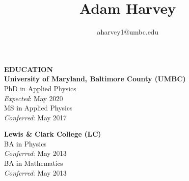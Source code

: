\documentclass{article}
\begin{document}
\singlespacing



\title{Adam Harvey}
\author{aharvey1@umbc.edu}


\maketitle
\noindent\textbf{EDUCATION}\\
\textbf{University of Maryland, Baltimore County (UMBC)}\\
PhD in Applied Physics\\
\indent \emph{Expected}: May 2020\\
MS in Applied Physics\\
\indent \emph{Conferred}: May 2017\\
\par
\noindent\textbf{Lewis \& Clark College (LC)}\\
BA in Physics\\
\indent \emph{Conferred}: May 2013\\
BA in Mathematics\\
\indent \emph{Conferred}: May 2013\\
\par
\end{document}

